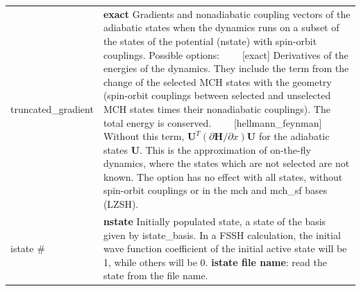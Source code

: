 \documentclass{report}
\newcommand{\tabitem}{~~\llap{--}~~}
\begin{document}
\begin{tabularx}{\textwidth}{ m{2.5cm} X }
truncated\_gradient		&
    \textbf{exact} \newline
    Gradients and nonadiabatic coupling vectors of the adiabatic states when the dynamics runs on a subset of the states of the potential (nstate) with spin-orbit couplings. Possible options: \newline
	\tabitem [exact] Derivatives of the energies of the dynamics. They include the term from the change of the selected MCH states with the geometry (spin-orbit couplings between selected and unselected MCH states times their nonadiabatic couplings). The total energy is conserved. \newline
	\tabitem [hellmann\_feynman] Without this term, $\mathbf{U}^T (\partial \mathbf{H} / \partial x) \mathbf{U}$ for the adiabatic states $\mathbf{U}$. This is the approximation of on-the-fly dynamics, where the states which are not selected are not known. \newline
	The option has no effect with all states, without spin-orbit couplings or in the mch and mch\_sf bases (LZSH).  \\

istate \#		&
    \textbf{nstate} \newline
    Initially populated state, a state of the basis given by istate\_basis. In a FSSH calculation, the initial wave function coefficient of the initial active state will be 1, while others will be 0. \newline
    \textbf{istate file name}: read the state from the file name.  \\


\end{tabularx}
\end{document}
